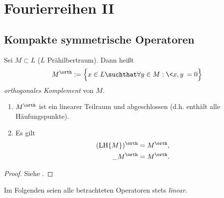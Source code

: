 
\chapter{Fourierreihen II}

\section{Kompakte symmetrische Operatoren}


\begin{df} \label{3.1}
	Sei $M \subset L$ ($L$ Prähilbertraum).
	Dann heißt
	\[
		M^\orth := \Big\{ x \in L \suchthat \forall y \in M : \<x,y\> = 0 \Big\}
	\]
	\emph{orthogonales Komplement} von $M$.
\end{df}

\begin{st} \label{3.2}
	\begin{enumerate}[1)]
		\item
			$M^\orth$ ist ein linearer Teilraum und abgeschlossen (d.h. enthält alle Häufungspunkte).
		\item Es gilt
			\begin{align*}
				(\LH \{M\})^\orth &= M^\orth ,\\
				\_M^\orth &= M^\orth.
			\end{align*}
	\end{enumerate}
	\begin{proof}
		Siehe .
	\end{proof}
\end{st}

\begin{conv*}
	Im Folgenden seien alle betrachteten Operatoren stets \emph{linear}.
\end{conv*}

